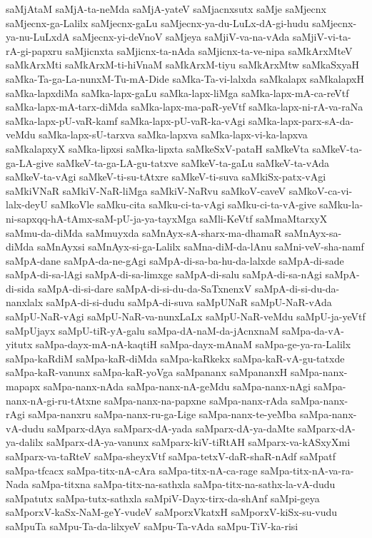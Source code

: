 {saMjAtaM
saMjA-ta-neMda
saMjA-yateV
saMjacnxsutx
saMje
saMjecnx
saMjecnx-ga-Lalilx
saMjecnx-gaLu
saMjecnx-ya-du-LuLx-dA-gi-hudu
saMjecnx-ya-nu-LuLxdA
saMjecnx-yi-deVnoV
saMjeya
saMjiV-va-na-vAda
saMjiV-vi-ta-rA-gi-papxru
saMjicnxta
saMjicnx-ta-nAda
saMjicnx-ta-ve-nipa
saMkArxMteV
saMkArxMti
saMkArxM-ti-hiVnaM
saMkArxM-tiyu
saMkArxMtw
saMkaSxyaH
saMka-Ta-ga-La-nunxM-Tu-mA-Dide
saMka-Ta-vi-lalxda
saMkalapx
saMkalapxH
saMka-lapxdiMa
saMka-lapx-gaLu
saMka-lapx-liMga
saMka-lapx-mA-ca-reVtf
saMka-lapx-mA-tarx-diMda
saMka-lapx-ma-paR-yeVtf
saMka-lapx-ni-rA-va-raNa
saMka-lapx-pU-vaR-kamf
saMka-lapx-pU-vaR-ka-vAgi
saMka-lapx-parx-sA-da-veMdu
saMka-lapx-sU-tarxva
saMka-lapxva
saMka-lapx-vi-ka-lapxva
saMkalapxyX
saMka-lipxsi
saMka-lipxta
saMkeSxV-pataH
saMkeVta
saMkeV-ta-ga-LA-give
saMkeV-ta-ga-LA-gu-tatxve
saMkeV-ta-gaLu
saMkeV-ta-vAda
saMkeV-ta-vAgi
saMkeV-ti-su-tAtxre
saMkeV-ti-suva
saMkiSx-patx-vAgi
saMkiVNaR
saMkiV-NaR-liMga
saMkiV-NaRvu
saMkoV-caveV
saMkoV-ca-vi-lalx-deyU
saMkoVle
saMku-cita
saMku-ci-ta-vAgi
saMku-ci-ta-vA-give
saMku-la-ni-sapxqq-hA-tAmx-saM-pU-ja-ya-tayxMga
saMli-KeVtf
saMmaMtarxyX
saMmu-da-diMda
saMmuyxda
saMnAyx-sA-sharx-ma-dhamaR
saMnAyx-sa-diMda
saMnAyxsi
saMnAyx-si-ga-Lalilx
saMna-diM-da-lAnu
saMni-veV-sha-namf
saMpA-dane
saMpA-da-ne-gAgi
saMpA-di-sa-ba-hu-da-lalxde
saMpA-di-sade
saMpA-di-sa-lAgi
saMpA-di-sa-limxge
saMpA-di-salu
saMpA-di-sa-nAgi
saMpA-di-sida
saMpA-di-si-dare
saMpA-di-si-du-da-SaTxnenxV
saMpA-di-si-du-da-nanxlalx
saMpA-di-si-dudu
saMpA-di-suva
saMpUNaR
saMpU-NaR-vAda
saMpU-NaR-vAgi
saMpU-NaR-va-nunxLaLx
saMpU-NaR-veMdu
saMpU-ja-yeVtf
saMpUjayx
saMpU-tiR-yA-galu
saMpa-dA-naM-da-jAcnxnaM
saMpa-da-vA-yitutx
saMpa-dayx-mA-nA-kaqtiH
saMpa-dayx-mAnaM
saMpa-ge-ya-ra-Lalilx
saMpa-kaRdiM
saMpa-kaR-diMda
saMpa-kaRkekx
saMpa-kaR-vA-gu-tatxde
saMpa-kaR-vanunx
saMpa-kaR-yoVga
saMpananx
saMpananxH
saMpa-nanx-mapapx
saMpa-nanx-nAda
saMpa-nanx-nA-geMdu
saMpa-nanx-nAgi
saMpa-nanx-nA-gi-ru-tAtxne
saMpa-nanx-na-papxne
saMpa-nanx-rAda
saMpa-nanx-rAgi
saMpa-nanxru
saMpa-nanx-ru-ga-Lige
saMpa-nanx-te-yeMba
saMpa-nanx-vA-dudu
saMparx-dAya
saMparx-dA-yada
saMparx-dA-ya-daMte
saMparx-dA-ya-dalilx
saMparx-dA-ya-vanunx
saMparx-kiV-tiRtAH
saMparx-va-kASxyXmi
saMparx-va-taRteV
saMpa-sheyxVtf
saMpa-tetxV-daR-shaR-nAdf
saMpatf
saMpa-tfcacx
saMpa-titx-nA-cAra
saMpa-titx-nA-ca-rage
saMpa-titx-nA-va-ra-Nada
saMpa-titxna
saMpa-titx-na-sathxla
saMpa-titx-na-sathx-la-vA-dudu
saMpatutx
saMpa-tutx-sathxla
saMpiV-Dayx-tirx-da-shAnf
saMpi-geya
saMporxV-kaSx-NaM-geY-vudeV
saMporxVkatxH
saMporxV-kiSx-su-vudu
saMpuTa
saMpu-Ta-da-lilxyeV
saMpu-Ta-vAda
saMpu-TiV-ka-risi
}
